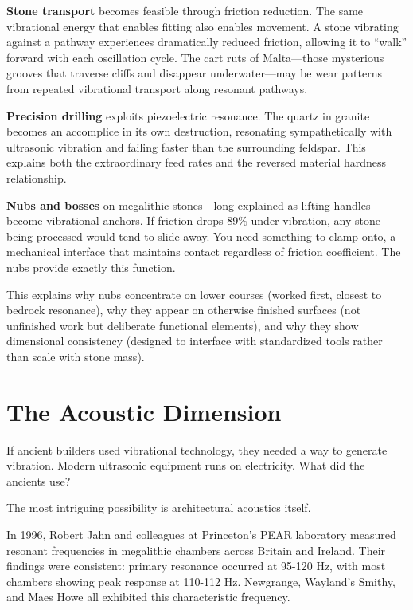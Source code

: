 \documentclass[11pt]{article}
\begin{document}
\textbf{Stone transport} becomes feasible through friction reduction. The same vibrational energy that enables fitting also enables movement. A stone vibrating against a pathway experiences dramatically reduced friction, allowing it to ``walk'' forward with each oscillation cycle. The cart ruts of Malta---those mysterious grooves that traverse cliffs and disappear underwater---may be wear patterns from repeated vibrational transport along resonant pathways.

\textbf{Precision drilling} exploits piezoelectric resonance. The quartz in granite becomes an accomplice in its own destruction, resonating sympathetically with ultrasonic vibration and failing faster than the surrounding feldspar. This explains both the extraordinary feed rates and the reversed material hardness relationship.

\textbf{Nubs and bosses} on megalithic stones---long explained as lifting handles---become vibrational anchors. If friction drops 89\% under vibration, any stone being processed would tend to slide away. You need something to clamp onto, a mechanical interface that maintains contact regardless of friction coefficient. The nubs provide exactly this function.

This explains why nubs concentrate on lower courses (worked first, closest to bedrock resonance), why they appear on otherwise finished surfaces (not unfinished work but deliberate functional elements), and why they show dimensional consistency (designed to interface with standardized tools rather than scale with stone mass).

\section{The Acoustic Dimension}

If ancient builders used vibrational technology, they needed a way to generate vibration. Modern ultrasonic equipment runs on electricity. What did the ancients use?

The most intriguing possibility is architectural acoustics itself.

In 1996, Robert Jahn and colleagues at Princeton's PEAR laboratory measured resonant frequencies in megalithic chambers across Britain and Ireland. Their findings were consistent: primary resonance occurred at 95-120 Hz, with most chambers showing peak response at 110-112 Hz. Newgrange, Wayland's Smithy, and Maes Howe all exhibited this characteristic frequency.
\end{document}
